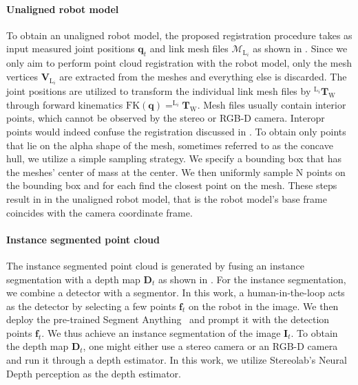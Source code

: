 \paragraph{Unaligned robot model}
\label{c4:sec:unaligned_robot_model}
To obtain an unaligned robot model, the proposed registration procedure takes as input measured joint positions $\mathbf{q}_t$ and link mesh files $\mathcal{M}_{\text{L}_i}$ as shown in . Since we only aim to perform point cloud registration with the robot model, only the mesh vertices $\mathbf{V}_{\text{L}_i}$ are extracted from the meshes and everything else is discarded. The joint positions are utilized to transform the individual link mesh files by $^{\text{L}_i}\mathbf{T}_\text{W}$ through forward kinematics $\text{FK}(\mathbf{q}) = ^{\text{L}_i}\mathbf{T}_\text{W}$. Mesh files usually contain interior points, which cannot be observed by the stereo or RGB-D camera.
Interopr points would indeed confuse the registration discussed in . To obtain only points that lie on the alpha shape of the mesh, sometimes referred to as the concave hull, we utilize a simple sampling strategy. We specify a bounding box that has the meshes' center of mass at the center. We then uniformly sample N points on the bounding box and for each find the closest point on the mesh. These steps result in in the unaligned robot model, that is the robot model's base frame coincides with the camera coordinate frame.

\paragraph{Instance segmented point cloud}
\label{c4:sec:instance_segmented_point_cloud}
The instance segmented point cloud is generated by fusing an instance segmentation with a depth map $\mathbf{D}_t$ as shown in . For the instance segmentation, we combine a detector with a segmentor. In this work, a human-in-the-loop acts as the detector by selecting a few points $\mathbf{f}_t$ on the robot in the image. We then deploy the pre-trained Segment Anything~\cite{segment_anything} and prompt it with the detection points $\mathbf{f}_t$. We thus achieve an instance segmentation of the image $\mathbf{I}_t$. To obtain the depth map $\mathbf{D}_t$, one might either use a stereo camera or an RGB-D camera and run it through a depth estimator. In this work, we utilize Stereolab's Neural Depth perception as the depth estimator.

